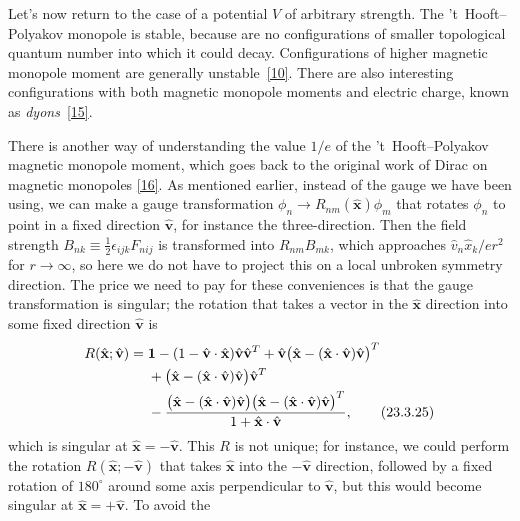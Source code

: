 Let's now return to the case of a potential $V$ of arbitrary strength. The
't~Hooft--Polyakov monopole is stable, because are no configurations of
smaller topological quantum number into which it could decay.
Configurations of higher magnetic monopole moment are generally
unstable~\hyperref[ch23-ref-10]{[10]}. There are also interesting
configurations with both magnetic monopole moments and electric charge,
known as \emph{dyons}~\hyperref[ch23-ref-15]{[15]}.

There is another way of understanding the value $1/e$ of the
't~Hooft--Polyakov magnetic monopole moment, which goes back to the
original work of Dirac on magnetic monopoles \hyperref[ch23-ref-16]{[16]}.
As mentioned earlier, instead of the gauge we have been using, we can make
a gauge transformation
$\phi_n\to R_{nm}(\hat{\mathbf x})\phi_m$ that rotates $\phi_n$ to point
in a fixed direction $\hat{\mathbf v}$, for instance the three-direction.
Then the field strength
$B_{nk}\equiv\frac12\epsilon_{ijk}F_{nij}$ is transformed into
$R_{nm}B_{mk}$, which approaches
$\hat v_n\hat x_k/er^2$ for $r\to\infty$, so here we do not have to
project this on a local unbroken symmetry direction. The price we need to
pay for these conveniences is that the gauge transformation is singular;
the rotation that takes a vector in the $\hat{\mathbf x}$ direction into
some fixed direction $\hat{\mathbf v}$ is
\begin{align}
 R(\hat{\mathbf x};\hat{\mathbf v})={}&
 \mathbf{1}-(1-\hat{\mathbf v}\cdot\hat{\mathbf x})
 \hat{\mathbf v}\hat{\mathbf v}^{T}
 +\hat{\mathbf v}
 \bigl(\hat{\mathbf x}-(\hat{\mathbf x}\cdot\hat{\mathbf v})
 \hat{\mathbf v}\bigr)^{T}
 \notag\\
 &+\bigl(\hat{\mathbf x}-(\hat{\mathbf x}\cdot\hat{\mathbf v})
 \hat{\mathbf v}\bigr)\hat{\mathbf v}^{T}
 \notag\\
 &-\frac{
 \bigl(\hat{\mathbf x}-(\hat{\mathbf x}\cdot\hat{\mathbf v})
 \hat{\mathbf v}\bigr)
 \bigl(\hat{\mathbf x}-(\hat{\mathbf x}\cdot\hat{\mathbf v})
 \hat{\mathbf v}\bigr)^{T}}
 {1+\hat{\mathbf x}\cdot\hat{\mathbf v}},
 \tag{23.3.25}\label{eq:23.3.25}
\end{align}
which is singular at $\hat{\mathbf x}=-\hat{\mathbf v}$. This $R$ is not
unique; for instance, we could perform the rotation
$R(\hat{\mathbf x};-\hat{\mathbf v})$ that takes $\hat{\mathbf x}$ into
the $-\hat{\mathbf v}$ direction, followed by a fixed rotation of
$180^\circ$ around some axis perpendicular to $\hat{\mathbf v}$, but this
would become singular at $\hat{\mathbf x}=+\hat{\mathbf v}$. To avoid the
